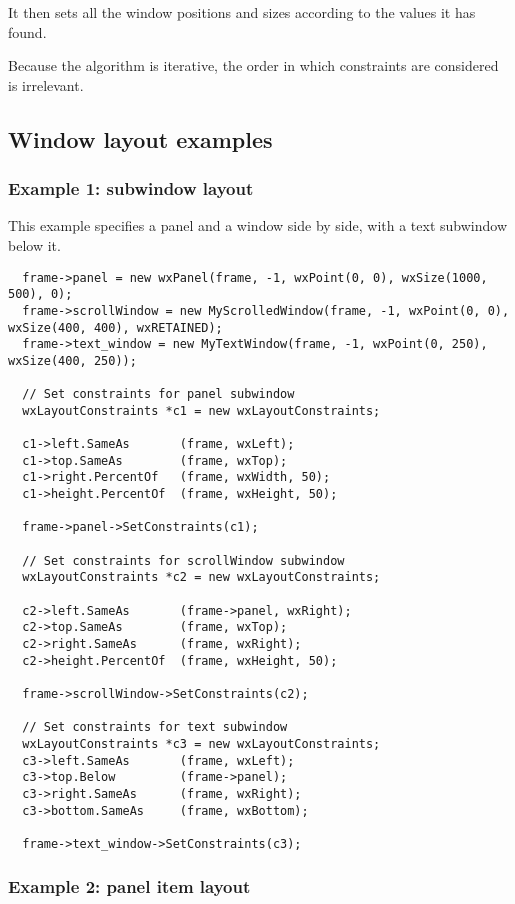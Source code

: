 It then sets all the window positions and sizes according to the values it has found.

Because the algorithm is iterative, the order in which constraints are considered is
irrelevant.

\subsection{Window layout examples}\label{layoutexamples}

\subsubsection{Example 1: subwindow layout}

This example specifies a panel and a window side by side,
with a text subwindow below it. 

\begin{verbatim}
  frame->panel = new wxPanel(frame, -1, wxPoint(0, 0), wxSize(1000, 500), 0);
  frame->scrollWindow = new MyScrolledWindow(frame, -1, wxPoint(0, 0), wxSize(400, 400), wxRETAINED);
  frame->text_window = new MyTextWindow(frame, -1, wxPoint(0, 250), wxSize(400, 250));

  // Set constraints for panel subwindow
  wxLayoutConstraints *c1 = new wxLayoutConstraints;

  c1->left.SameAs       (frame, wxLeft);
  c1->top.SameAs        (frame, wxTop);
  c1->right.PercentOf   (frame, wxWidth, 50);
  c1->height.PercentOf  (frame, wxHeight, 50);

  frame->panel->SetConstraints(c1);

  // Set constraints for scrollWindow subwindow
  wxLayoutConstraints *c2 = new wxLayoutConstraints;

  c2->left.SameAs       (frame->panel, wxRight);
  c2->top.SameAs        (frame, wxTop);
  c2->right.SameAs      (frame, wxRight);
  c2->height.PercentOf  (frame, wxHeight, 50);

  frame->scrollWindow->SetConstraints(c2);

  // Set constraints for text subwindow
  wxLayoutConstraints *c3 = new wxLayoutConstraints;
  c3->left.SameAs       (frame, wxLeft);
  c3->top.Below         (frame->panel);
  c3->right.SameAs      (frame, wxRight);
  c3->bottom.SameAs     (frame, wxBottom);

  frame->text_window->SetConstraints(c3);
\end{verbatim}

\subsubsection{Example 2: panel item layout}

